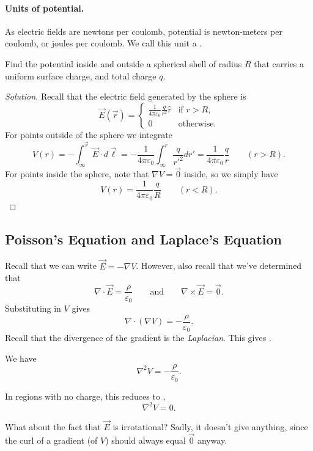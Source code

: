 \paragraph{Units of potential.} As electric fields are newtons per coulomb, potential is newton-meters per coulomb, or joules per coulomb. We call this unit a .

\begin{example}
Find the potential inside and outside a spherical shell of radius $R$ that carries a uniform surface charge, and total charge $q$.
\end{example}

\begin{proof}[Solution]
    Recall that the electric field generated by the sphere is
    \[\vec{E}(\vec{r})=\begin{cases}
        \frac{1}{4\pi \varepsilon_0}\frac{q}{r^2}\hat{r} & \text{if }r>R,\\
        0 & \text{otherwise}.
    \end{cases}\]
    For points outside of the sphere we integrate
    \[V(r)=-\int_\infty^{\vec{r}}\vec{E}\cdot d\vec{\ell}=-\frac{1}{4\pi \varepsilon_0}\int_\infty^r \frac{q}{r'^2}dr'=\frac{1}{4\pi\varepsilon_0}\frac{q}{r} \qquad (r>R).\]
    For points inside the sphere, note that $\nabla V=\vec{0}$ inside, so we simply have 
    \[V(r)=\frac{1}{4\pi\varepsilon_0}\frac{q}{R}\qquad (r<R).\]
\end{proof}

\subsection{Poisson's Equation and Laplace's Equation}

Recall that we can write $\vec{E}=-\nabla V$. However, also recall that we've determined that
\[\nabla\cdot \vec{E}=\frac{\rho}{\varepsilon_0}\qquad \text{and}\qquad\nabla\times\vec{E}=\vec{0}.\]
Substituting in $V$ gives
\[\nabla\cdot (\nabla V)=-\frac{\rho}{\varepsilon_0}.\]
Recall that the divergence of the gradient is the \textit{Laplacian}. This gives .

\begin{theorem}
We have
\[\nabla^2 V=-\frac{\rho}{\varepsilon_0}.\]
\end{theorem}

In regions with no charge, this reduces to ,
\[\nabla^2 V=0.\]

What about the fact that $\vec{E}$ is irrotational? Sadly, it doesn't give anything, since the curl of a gradient (of $V$) should always equal $\vec{0}$ anyway.

